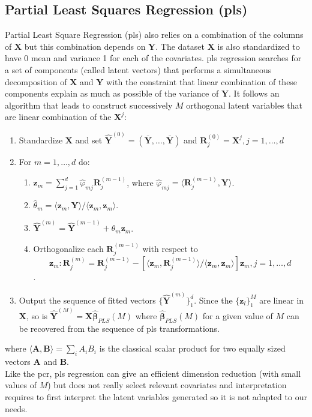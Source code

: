 \documentclass[12pt,a4paper]{report}
\begin{document}
			\subsection{Partial Least Squares Regression ({\sc pls})}\label{plsreg}

	Partial Least Square Regression ({\sc pls})\cite{abdi2003partial,geladi1986partial} also relies on a combination of the columns of  $\boldsymbol{X}$ but this combination depends on $\boldsymbol{Y}$. The dataset $\boldsymbol{X}$ is also standardized to have 0 mean and variance 1 for each of the covariates. {\sc pls} regression searches for a set
of components (called latent vectors) that performs a simultaneous decomposition of $\boldsymbol{X}$ and $\boldsymbol{Y}$ with the constraint that linear combination of these components explain as much as possible of the variance of $\boldsymbol{Y}$. It follows an algorithm that leads to construct successively $M$ orthogonal latent variables that are linear combination of the $\boldsymbol{X}^j$:
\begin{enumerate}
	\item Standardize $\boldsymbol{X}$ and set $\hat{\boldsymbol{Y}}^{(0)} 
	=(\bar{\boldsymbol{Y}},\dots,\bar{\boldsymbol{Y}})$ and $\boldsymbol{R}_j^{(0)}=\boldsymbol{X}^j,j=1,\dots,d$
	\item For $m=1,\dots,d$ do:
	\begin{enumerate}
		\item $\boldsymbol{z}_m=\sum_{j=1}^d \hat{\varphi}_{mj}\boldsymbol{R}_j^{(m-1)}$, where $\hat{\varphi}_{mj}=\langle \boldsymbol{R}_j^{(m-1)},\boldsymbol{Y}\rangle$.
		\item $\hat{\theta}_m= \langle \boldsymbol{z}_m,\boldsymbol{Y} \rangle / \langle \boldsymbol{z}_m,\boldsymbol{z}_m \rangle$.
		\item $\hat{\boldsymbol{Y}}^{(m)} =\hat{\boldsymbol{Y}}^{(m-1)}+\hat{\theta}_m\boldsymbol{z}_m$.
		\item Orthogonalize each $\boldsymbol{R}_j^{(m-1)}$ with respect to $$\boldsymbol{z}_m: \boldsymbol{R}_j^{(m)}=\boldsymbol{R}_j^{(m-1)}-\left[ \langle \boldsymbol{z}_m,\boldsymbol{R}_j^{(m-1)} \rangle/ \langle \boldsymbol{z}_m,\boldsymbol{z}_m \rangle \right]\boldsymbol{z}_m, j=1,\dots,d$$.
	\end{enumerate}
	\item Output the sequence of fitted vectors $\{\hat{\boldsymbol{Y}}^{(m)}\}_1^d$. Since the $\{ \boldsymbol{z}_l\}_1^M$ are linear in $\boldsymbol{X}$, so is $\hat{\boldsymbol{Y}}^{(M)}=\boldsymbol{X}\hat{\boldsymbol{\beta}}_{PLS}(M)$ where $\hat{\boldsymbol{\beta}}_{PLS}(M)$ for a given value of $M$ can be recovered from the sequence of {\sc pls} transformations.
\end{enumerate}
where $\langle \boldsymbol{A},\boldsymbol{B} \rangle=\sum_i A_iB_i$ is the classical scalar product for two equally sized vectors $\boldsymbol{A}$ and $\boldsymbol{B}$.\\
Like the {\sc pcr}, {\sc pls} regression can give an efficient dimension reduction (with small values of $M$) but does not really select relevant covariates and interpretation requires to first interpret the latent variables generated so it is not adapted to our needs.
\end{document}
